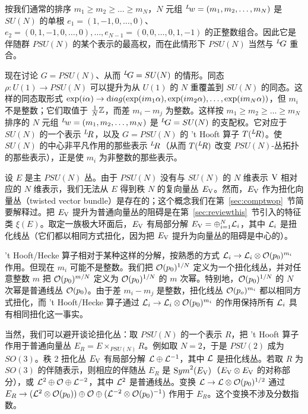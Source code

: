 按我们通常的排序 $m_1\geq m_2\geq\dots\geq m_N$，$N$ 元组 $^L\negthinspace w=(m_1,m_2,\dots,m_N)$ 是 $SU(N)$ 的单根 $e_1=(1,-1,0,\dots,0)$、$e_2=(0,1,-1,0,\dots,0),\dots ,e_{N-1}=(0,0,\dots,0,1,-1)$ 的正整数组合。因此它是伴随群 $PSU(N)$ 的某个表示的最高权，而在此情形下 $PSU(N)$ 当然与 $^L\negthinspace G$ 重合。

现在讨论 $G=PSU(N)$、从而 $^L\negthinspace G=SU(N)$ 的情形。同态 $\rho:U(1)\to PSU(N)$ 可以提升为从 $U(1)$ 的 $N$ 重覆盖到 $SU(N)$ 的同态。这样的同态取形式 $\exp(i\alpha)\to{\rm diag}(\exp(im_1\alpha),\exp(im_2\alpha),\dots,\exp(im_N\alpha))$，但 $m_i$ 不是整数；它们取值于 ${1\over N}\Bbb{Z}$，而差 $m_i-m_j$ 为整数。这样按 $m_1\geq m_2\geq \dots\geq m_N$ 排序的 $N$ 元组 $^L\negthinspace w=(m_1,m_2,\dots,m_N)$ 是 $^L\negthinspace G=SU(N)$ 的支配权。它对应于 $SU(N)$ 的一个表示 $^L\negthinspace R$，以及 $G=PSU(N)$ 的 't Hooft 算子 $T(^L\negthinspace R)$。使 $SU(N)$ 的中心非平凡作用的那些表示 $^L\negthinspace R$（从而 $T(^L\negthinspace R)$ 改变 $PSU(N)$-丛拓扑的那些表示），正是使 $m_i$ 为非整数的那些表示。

设 $E$ 是主 $PSU(N)$ 丛。由于 $PSU(N)$ 没有与 $SU(N)$ 的 $N$ 维表示 $\VV$ 相对应的 $N$ 维表示，我们无法从 $E$ 得到秩 $N$ 的复向量丛 $E_\VV$。然而，$E_\VV$ 作为扭化向量丛（twisted vector bundle）是存在的；这个概念我们在第~\ref{sec:comptwop}~节简要解释过。把 $E_\VV$ 提升为普通向量丛的阻碍是在第~\ref{sec:reviewthis}~节引入的特征类 $\xi(E)$。取定一族极大环面后，$E_\VV$ 有局部分解 $E_\VV=\oplus_{i=1}^N{\cal L}_i$，其中 ${\cal L}_i$ 是扭化线丛（它们都以相同方式扭化，因为把 $E_\VV$ 提升为向量丛的阻碍是中心的）。

't Hooft/Hecke 算子相对于某种这样的分解，按熟悉的方式 ${\cal L}_i\to{\cal L}_i\otimes {\cal O}(p_0)^{m_i}$ 作用。但现在 $m_i$ 可能不是整数。我们把 ${\cal O}(p_0)^{1/N}$ 定义为一个扭化线丛，并对任意整数 $m$ 把 ${\cal O}(p_0)^{m/N}$ 定义为 ${\cal O}(p_0)^{1/N}$ 的 $m$ 次幂。特别地，${\cal O}(p_0)^{1/N}$ 的 $N$ 次幂是普通线丛 ${\cal O}(p_0)$。由于差 $m_i-m_j$ 是整数，扭化线丛 ${\cal O}(p_o)^{m_i}$ 都以相同方式扭化，而 't Hooft/Hecke 算子通过 ${\cal L}_i\to {\cal L}_i\otimes {\cal O}(p_0)^{m_i}$ 的作用保持所有 ${\cal L}_i$ 具有相同扭化这一事实。

当然，我们可以避开谈论扭化丛：取 $PSU(N)$ 的一个表示 $R$，把 't Hooft 算子作用于普通向量丛 $E_R=E\times_{PSU(N)}R$。例如取 $N=2$，于是 $PSU(2)$ 成为 $SO(3)$。秩 2 扭化丛 $E_\VV$ 有局部分解 ${\cal L}\oplus {\cal L}^{-1}$，其中 ${\cal L}$ 是扭化线丛。若取 $R$ 为 $SO(3)$ 的伴随表示，则相应的伴随丛 $E_R$ 是 ${\rm Sym}^2(E_\VV)$（$E_\VV\otimes E_\VV$ 的对称部分），或 ${\cal L}^2\oplus {\cal O}\oplus {\cal L}^{-2}$，其中 ${\cal L}^2$ 是普通线丛。变换 ${\cal L}\to {\cal L}\otimes {\cal O}(p_0)^{1/2}$ 通过 $E_R\to ({\cal L}^2\otimes \CO(p_0))\oplus \CO\oplus ({\cal L}^{-2}\otimes \CO(p_0)^{-1})$ 作用于 $E_R$。这个变换不涉及分数指数。

